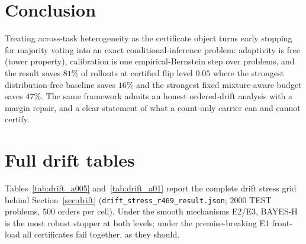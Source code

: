 \documentclass{article}
\theoremstyle{definition}
\theoremstyle{remark}
\begin{document}
\section{Conclusion}
Treating across-task heterogeneity as the certificate object turns early
stopping for majority voting into an exact conditional-inference problem:
adaptivity is free (tower property), calibration is one empirical-Bernstein
step over problems, and the result saves $81\%$ of rollouts at certified flip
level $0.05$ where the strongest distribution-free baseline saves $16\%$ and
the strongest fixed mixture-aware budget saves $47\%$. The same framework
admits an honest ordered-drift analysis with a margin repair, and a clear
statement of what a count-only carrier can and cannot certify.




\appendix




\section{Full drift tables}
\label{app:drift}
Tables~\ref{tab:drift_a005} and~\ref{tab:drift_a01} report the complete
drift stress grid behind Section~\ref{sec:drift}
(\texttt{drift\_stress\_r469\_result.json}; 2000 TEST problems, 500
orders per cell). Under the smooth mechanisms E2/E3, BAYES-H is the most
robust stopper at both levels; under the premise-breaking E1 front-load
all certificates fail together, as they should.

\end{document}
